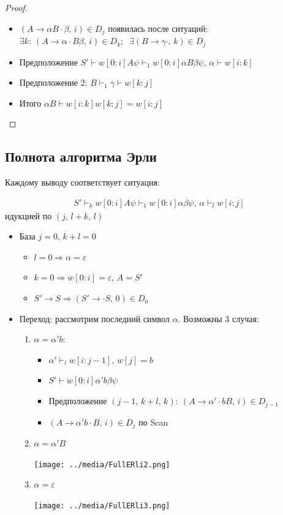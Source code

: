 \documentclass[a4paper,12pt]{article}
\theoremstyle{plain}
\theoremstyle{definition}
\theoremstyle{remark}
\begin{document}
\begin{proof}
\begin{itemize}
		      \begin{itemize}
			      \item $(A \to \alpha B \cdot\beta,\, i) \in D_j$ появилась после ситуаций: $\exists k :\: (A \to \alpha\cdot B \beta,\, i) \in D_k;\;\; \exists (B \to \gamma\cdot,\, k) \in D_j$
			      \item Предположение $S' \vdash w[0:i]A\psi \vdash_1 w[0:i]\alpha B\beta\psi,\, \alpha \vdash w[i:k]$
			      \item Предположение 2: $B \vdash_1 \gamma \vdash w[k:j]$
			      \item Итого $\alpha B \vdash w[i:k]w[k:j] = w[i:j]$
		      \end{itemize}
	\end{itemize}
\end{proof}

\subsection{Полнота алгоритма Эрли}
Каждому выводу соответствует ситуация:

\begin{align*}
	S' \vdash_k w[0:i]A\psi \vdash_1 w[0:i]\alpha\beta\psi,\, \alpha\vdash_l w[i:j]
\end{align*}
идукцией по $(j,\, l + k,\, l)$
\begin{itemize}
	\item База $j = 0,\, k + l = 0$
	      \begin{itemize}
		      \item $l = 0 \Rightarrow \alpha = \varepsilon$
		      \item $k = 0 \Rightarrow w[0:i] = \varepsilon,\, A = S'$
		      \item $S' \to S \Rightarrow (S' \to \cdot S,\, 0) \in D_0$
	      \end{itemize}
	\item Переход: рассмотрим последний символ $\alpha$. Возможны 3 случая:
	      \begin{enumerate}
		      \item $\alpha = \alpha' b$:
		            \begin{itemize}
			            \item $\alpha' \vdash_l w[i : j-1],\, w[j] = b$
			            \item $S' \vdash w[0:i]\alpha'b\beta\psi$
			            \item Предположение $(j - 1,\, k+l,\,k):\: (A \to \alpha'\cdot bB,\, i) \in D_{j - 1}$
			            \item $(A \to \alpha'b\cdot B,\, i) \in D_j$ по Scan
		            \end{itemize}
		      \item $\alpha = \alpha' B$

		            \texttt{[image: ../media/FullERli2.png]}
		      \item $\alpha = \varepsilon$

		            \texttt{[image: ../media/FullERli3.png]}
	      \end{enumerate}
\end{itemize}
\end{document}
